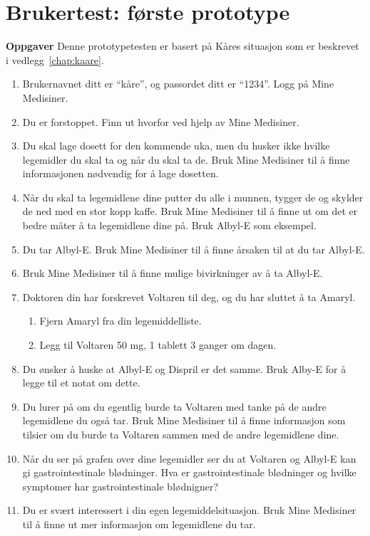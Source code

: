 \chapter{Brukertest: første prototype} \label{chap:brukertest}

\textbf{Oppgaver}
Denne prototypetesten er basert på Kåres situasjon som er beskrevet i vedlegg~\ref{chap:kaare}.  

\begin{enumerate}
\item Brukernavnet ditt er “kåre”, og passordet ditt er “1234”. Logg på Mine Medisiner.
\item Du er forstoppet. Finn ut hvorfor ved hjelp av Mine Medisiner.
\item Du skal lage dosett for den kommende uka, men du husker ikke hvilke legemidler du skal ta og når du skal ta de. Bruk Mine Medisiner til å finne informasjonen nødvendig for å lage dosetten.
\item Når du skal ta legemidlene dine putter du alle i munnen, tygger de og skylder de ned med en stor kopp kaffe. Bruk Mine Medisiner til å finne ut om det er bedre måter å ta legemidlene dine på. Bruk Albyl-E som eksempel.
\item Du tar Albyl-E. Bruk Mine Medisiner til å finne årsaken til at du tar Albyl-E.
\item Bruk Mine Medisiner til å finne mulige bivirkninger av å ta Albyl-E.
\item Doktoren din har forskrevet Voltaren til deg, og du har sluttet å ta Amaryl.
\begin{enumerate}
\item Fjern Amaryl fra din legemiddelliste.
\item Legg til Voltaren 50 mg, 1 tablett 3 ganger om dagen.
\end{enumerate}
\item Du ønsker å huske at Albyl-E og Dispril er det samme. Bruk Alby-E for å legge til et notat om dette.
\item Du lurer på om du egentlig burde ta Voltaren med tanke på de andre legemidlene du også tar. Bruk Mine Medisiner til å finne informasjon som tilsier om du burde ta Voltaren sammen med de andre legemidlene dine.
\item Når du ser på grafen over dine legemidler ser du at Voltaren og Albyl-E kan gi gastrointestinale blødninger. Hva er gastrointestinale blødninger og hvilke symptomer har gastrointestinale blødnigner?
\item Du er svært interessert i din egen legemiddelsituasjon. Bruk Mine Medisiner til å finne ut mer informasjon om legemidlene du tar. 

\end{enumerate}
